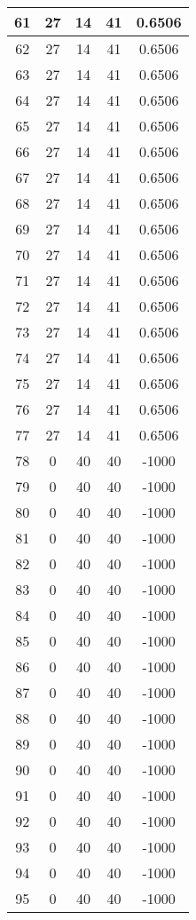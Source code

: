 \documentclass[letterpaper, 12pt]{article}
\begin{document}
\begin{longtable}{|c|c|c|c|c|}
\hline
61 & 27 & 14 & 41 & 0.6506 \\
\hline
62 & 27 & 14 & 41 & 0.6506 \\
\hline
63 & 27 & 14 & 41 & 0.6506 \\
\hline
64 & 27 & 14 & 41 & 0.6506 \\
\hline
65 & 27 & 14 & 41 & 0.6506 \\
\hline
66 & 27 & 14 & 41 & 0.6506 \\
\hline
67 & 27 & 14 & 41 & 0.6506 \\
\hline
68 & 27 & 14 & 41 & 0.6506 \\
\hline
69 & 27 & 14 & 41 & 0.6506 \\
\hline
70 & 27 & 14 & 41 & 0.6506 \\
\hline
71 & 27 & 14 & 41 & 0.6506 \\
\hline
72 & 27 & 14 & 41 & 0.6506 \\
\hline
73 & 27 & 14 & 41 & 0.6506 \\
\hline
74 & 27 & 14 & 41 & 0.6506 \\
\hline
75 & 27 & 14 & 41 & 0.6506 \\
\hline
76 & 27 & 14 & 41 & 0.6506 \\
\hline
77 & 27 & 14 & 41 & 0.6506 \\
\hline
78 & 0 & 40 & 40 & -1000 \\
\hline
79 & 0 & 40 & 40 & -1000 \\
\hline
80 & 0 & 40 & 40 & -1000 \\
\hline
81 & 0 & 40 & 40 & -1000 \\
\hline
82 & 0 & 40 & 40 & -1000 \\
\hline
83 & 0 & 40 & 40 & -1000 \\
\hline
84 & 0 & 40 & 40 & -1000 \\
\hline
85 & 0 & 40 & 40 & -1000 \\
\hline
86 & 0 & 40 & 40 & -1000 \\
\hline
87 & 0 & 40 & 40 & -1000 \\
\hline
88 & 0 & 40 & 40 & -1000 \\
\hline
89 & 0 & 40 & 40 & -1000 \\
\hline
90 & 0 & 40 & 40 & -1000 \\
\hline
91 & 0 & 40 & 40 & -1000 \\
\hline
92 & 0 & 40 & 40 & -1000 \\
\hline
93 & 0 & 40 & 40 & -1000 \\
\hline
94 & 0 & 40 & 40 & -1000 \\
\hline
95 & 0 & 40 & 40 & -1000 \\

\end{longtable}
\end{document}
